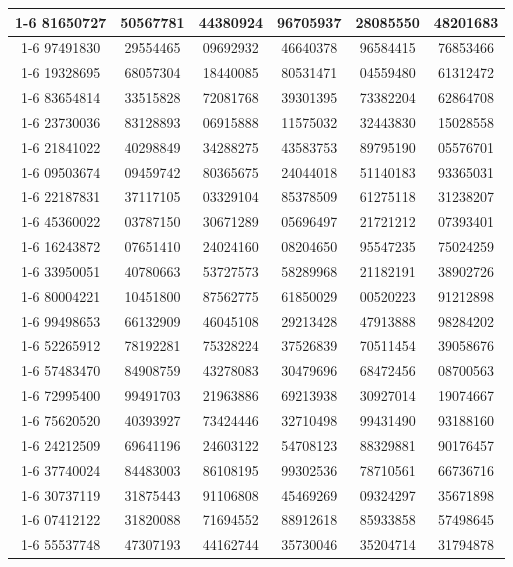 \documentclass[10pt]{article}
\begin{document}
\begin{center}
{\begin{tabular}{|c|c|c|c|c|c|}
\cline{1-6}
81650727 & 50567781 & 44380924 & 96705937 & 28085550 & 48201683 \\
\cline{1-6}
97491830 & 29554465 & 09692932 & 46640378 & 96584415 & 76853466 \\
\cline{1-6}
19328695 & 68057304 & 18440085 & 80531471 & 04559480 & 61312472 \\
\cline{1-6}
83654814 & 33515828 & 72081768 & 39301395 & 73382204 & 62864708 \\
\cline{1-6}
23730036 & 83128893 & 06915888 & 11575032 & 32443830 & 15028558 \\
\cline{1-6}
21841022 & 40298849 & 34288275 & 43583753 & 89795190 & 05576701 \\
\cline{1-6}
09503674 & 09459742 & 80365675 & 24044018 & 51140183 & 93365031 \\
\cline{1-6}
22187831 & 37117105 & 03329104 & 85378509 & 61275118 & 31238207 \\
\cline{1-6}
45360022 & 03787150 & 30671289 & 05696497 & 21721212 & 07393401 \\
\cline{1-6}
16243872 & 07651410 & 24024160 & 08204650 & 95547235 & 75024259 \\
\cline{1-6}
33950051 & 40780663 & 53727573 & 58289968 & 21182191 & 38902726 \\
\cline{1-6}
80004221 & 10451800 & 87562775 & 61850029 & 00520223 & 91212898 \\
\cline{1-6}
99498653 & 66132909 & 46045108 & 29213428 & 47913888 & 98284202 \\
\cline{1-6}
52265912 & 78192281 & 75328224 & 37526839 & 70511454 & 39058676 \\
\cline{1-6}
57483470 & 84908759 & 43278083 & 30479696 & 68472456 & 08700563 \\
\cline{1-6}
72995400 & 99491703 & 21963886 & 69213938 & 30927014 & 19074667 \\
\cline{1-6}
75620520 & 40393927 & 73424446 & 32710498 & 99431490 & 93188160 \\
\cline{1-6}
24212509 & 69641196 & 24603122 & 54708123 & 88329881 & 90176457 \\
\cline{1-6}
37740024 & 84483003 & 86108195 & 99302536 & 78710561 & 66736716 \\
\cline{1-6}
30737119 & 31875443 & 91106808 & 45469269 & 09324297 & 35671898 \\
\cline{1-6}
07412122 & 31820088 & 71694552 & 88912618 & 85933858 & 57498645 \\
\cline{1-6}
55537748 & 47307193 & 44162744 & 35730046 & 35204714 & 31794878 \\

\end{tabular}}
\end{center}
\end{document}
